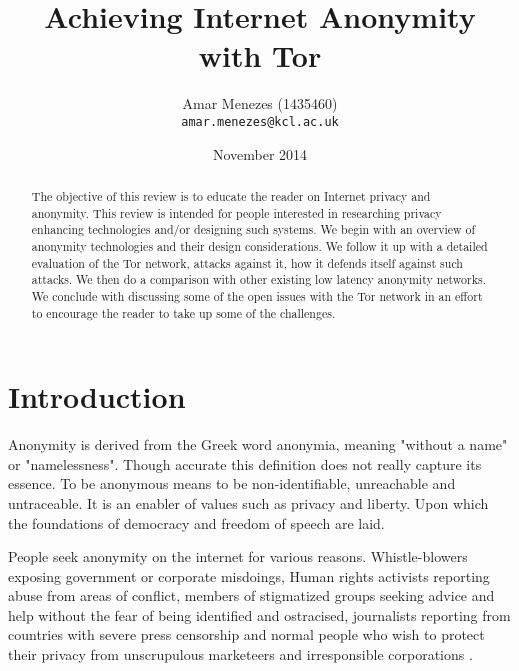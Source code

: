 \documentclass{llncs}
\begin{document}
\author{Amar Menezes (1435460)\\
\texttt{amar.menezes@kcl.ac.uk}}
\title{Achieving Internet Anonymity with Tor}
\date{November 2014}
\maketitle

\begin{abstract} 
	The objective of this review is to educate the reader on Internet privacy and anonymity. This review is intended for people interested in researching privacy enhancing technologies and/or designing such systems. We begin with an overview of anonymity technologies and their design considerations. We follow it up with a detailed evaluation of the Tor network, attacks against it, how it defends itself against such attacks. We then do a comparison with other existing low latency anonymity networks. We conclude with discussing some of the open issues with the Tor network in an effort to encourage the reader to take up some of the challenges. 
\end{abstract}

\section{Introduction} \label{intro}
Anonymity is derived from the Greek word anonymia, meaning "without a name" or "namelessness". Though accurate this definition does not really capture its essence. To be anonymous means to be non-identifiable, unreachable and untraceable. It is an enabler of values such as privacy and liberty. Upon which the foundations of democracy and freedom of speech are laid.

People seek anonymity on the internet for various reasons. Whistle-blowers exposing government or corporate misdoings, Human rights activists reporting abuse from areas of conflict, members of stigmatized groups seeking advice and help without the fear of being identified and ostracised, journalists reporting from countries with severe press censorship and normal people who wish to protect their privacy from unscrupulous marketeers and irresponsible corporations \cite{seekanonymity}.
\end{document}
